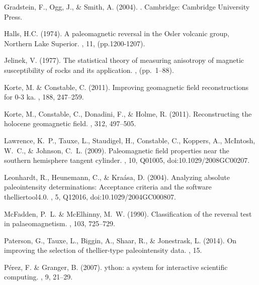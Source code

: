 \documentclass[11pt]{book}
\begin{document}
{{{\begin{thebibliography}{}
Gradstein, F., Ogg, J., \& Smith, A. (2004).
.
\newblock Cambridge: Cambridge University Press.

Halls, H.C. (1974).
\newblock A paleomagnetic reversal in the Osler volcanic group, Northern Lake Superior.
, 11, (pp.1200-1207).

Jelinek, V. (1977).
\newblock The statistical theory of measuring anisotropy of magnetic
  susceptibility of rocks and its application.
, (pp.\ 1--88).

Korte, M. \& Constable, C. (2011).
\newblock Improving geomagnetic field reconstructions for 0-3 ka.
, 188, 247--259.

Korte, M., Constable, C., Donadini, F., \& Holme, R. (2011).
\newblock Reconstructing the holocene geomagnetic field.
, 312, 497--505.

Lawrence, K.~P., Tauxe, L., Staudigel, H., Constable, C., Koppers, A.,
  McIntosh, W.~C., \& Johnson, C.~L. (2009).
\newblock Paleomagnetic field properties near the southern hemisphere tangent
  cylinder.
, 10, Q01005,
  doi:10.1029/2008GC00207.

Leonhardt, R., Heunemann, C., \& Kra\'asa, D. (2004).
\newblock Analyzing absolute paleointensity determinations: Acceptance criteria
  and the software thelliertool4.0.
, 5, Q12016, doi:10.1029/2004GC000807.

McFadden, P.~L. \& McElhinny, M.~W. (1990).
\newblock Classification of the reversal test in palaeomagnetism.
, 103, 725--729.

Paterson, G., Tauxe, L., Biggin, A., Shaar, R., \& Jonestrask, L. (2014).
\newblock On improving the selection of thellier-type paleointensity data.
, 15.

P\'{e}rez, F. \& Granger, B. (2007).
ython: a system for interactive scientific computing.
, 9, 21--29.


\end{thebibliography}}}}
\end{document}
